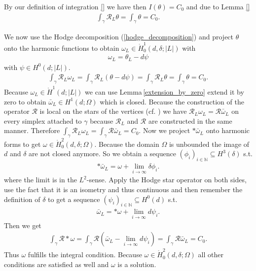 \documentclass[12pt,a4paper]{article}
\theoremstyle{definition}
\newcommand{\naturalnum}{\mathbb{N}}
\newcommand{\rop}{\mathscr{R}} %
\begin{document}
By our definition of integration \ref{}
we have then $I(\theta) = C_0$ and due to Lemma \ref{} 
\begin{align*}
    \int_\gamma \rop_L \theta = \int_\gamma \theta = C_0.
\end{align*} 

We now use the Hodge decomposition
(\ref{hodge_decomposition}) and project $\theta$ onto the harmonic functions 
to obtain $\omega_L \in \mathring{H}^1_0(d,\delta;|L|)$ with 
\begin{align*}
    \omega_L = \theta_L - d\psi
\end{align*}
with $\psi \in H^0(d;|L|)$. 
\begin{align*}
    \int_\gamma \rop_L \omega_L = \int_\gamma \rop_L (\theta - d\psi) =
    \int_\gamma \rop_L \theta = \int_\gamma \theta = C_0.
\end{align*}
Because $\omega_L \in \mathring{H}^1(d;|L|)$ we can use 
Lemma\,\ref{extension_by_zero} extend it by zero to 
obtain $\bar{\omega}_L \in H^1(d;\Omega)$ which is closed. 
Because the construction of the operator $\rop$ is local on the stars 
of the vertices
(cf. \cite{goldshtein}) we have $\rop_L \omega_L = \rop \bar{\omega}_L$ on 
every simplex attached to $\gamma$ because $\rop_L$ and $\rop$ are constructed
in the same manner. Therefore 
$\int_\gamma \rop_L \omega_L = \int_\gamma \rop \bar{\omega}_L = C_0$. 
Now we project $*\bar{\omega}_L$ onto harmonic forms to get 
$\omega \in \mathring{H}^2_0(d,\delta;\Omega)$. Because the domain $\Omega$
is unbounded the image of $d$ and $\delta$ are not closed anymore. So we 
obtain a sequence $(\phi_i)_{i \in \naturalnum} \subseteq H^3(\delta)$ s.t.
\begin{align*}
    *\bar{\omega}_L = \omega + \lim\limits_{i \rightarrow \infty}\delta \phi_i.
\end{align*}
where the limit is in the $L^2$-sense. Apply the Hodge star operator on 
both sides, use the fact that it is an isometry and thus continuous and then 
remember the definition of $\delta$ to get a sequence 
$(\psi_i)_{i \in \naturalnum} \subseteq H^0(d)$ s.t.
\begin{align*}
    \bar{\omega}_L = *\omega + \lim\limits_{i \rightarrow \infty}d \psi_i.
\end{align*}
Then we get
\begin{align*}
    \int_\gamma \rop * \omega 
    =\int_\gamma \rop (\bar{\omega}_L - 
    \lim\limits_{i \rightarrow \infty}d \psi_i) = 
    \int_\gamma \rop \bar{\omega}_L = C_0.
\end{align*}
Thus $\omega$ fulfills the integral condition. 
Because $\omega \in \mathring{H}^2_0(d,\delta;\Omega)$ all other conditions 
are satisfied as well and $\omega$ is a solution.
\end{document}
